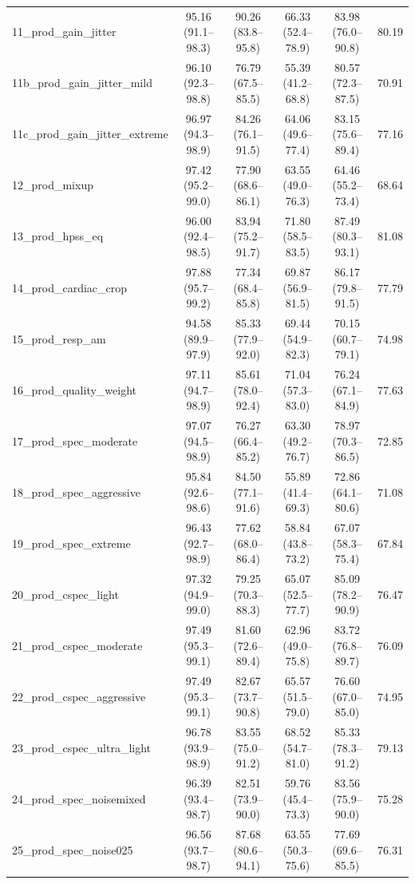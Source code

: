 \documentclass[10pt]{article}
\begin{document}
\begin{longtable}{lccccr}
11\_prod\_gain\_jitter & 95.16 (91.1--98.3) & 90.26 (83.8--95.8) & 66.33 (52.4--78.9) & 83.98 (76.0--90.8) & 80.19 \\
11b\_prod\_gain\_jitter\_mild & 96.10 (92.3--98.8) & 76.79 (67.5--85.5) & 55.39 (41.2--68.8) & 80.57 (72.3--87.5) & 70.91 \\
11c\_prod\_gain\_jitter\_extreme & 96.97 (94.3--98.9) & 84.26 (76.1--91.5) & 64.06 (49.6--77.4) & 83.15 (75.6--89.4) & 77.16 \\
12\_prod\_mixup & 97.42 (95.2--99.0) & 77.90 (68.6--86.1) & 63.55 (49.0--76.3) & 64.46 (55.2--73.4) & 68.64 \\
13\_prod\_hpss\_eq & 96.00 (92.4--98.5) & 83.94 (75.2--91.7) & 71.80 (58.5--83.5) & 87.49 (80.3--93.1) & 81.08 \\
14\_prod\_cardiac\_crop & 97.88 (95.7--99.2) & 77.34 (68.4--85.8) & 69.87 (56.9--81.5) & 86.17 (79.8--91.5) & 77.79 \\
15\_prod\_resp\_am & 94.58 (89.9--97.9) & 85.33 (77.9--92.0) & 69.44 (54.9--82.3) & 70.15 (60.7--79.1) & 74.98 \\
16\_prod\_quality\_weight & 97.11 (94.7--98.9) & 85.61 (78.0--92.4) & 71.04 (57.3--83.0) & 76.24 (67.1--84.9) & 77.63 \\
17\_prod\_spec\_moderate & 97.07 (94.5--98.9) & 76.27 (66.4--85.2) & 63.30 (49.2--76.7) & 78.97 (70.3--86.5) & 72.85 \\
18\_prod\_spec\_aggressive & 95.84 (92.6--98.6) & 84.50 (77.1--91.6) & 55.89 (41.4--69.3) & 72.86 (64.1--80.6) & 71.08 \\
19\_prod\_spec\_extreme & 96.43 (92.7--98.9) & 77.62 (68.0--86.4) & 58.84 (43.8--73.2) & 67.07 (58.3--75.4) & 67.84 \\
20\_prod\_cspec\_light & 97.32 (94.9--99.0) & 79.25 (70.3--88.3) & 65.07 (52.5--77.7) & 85.09 (78.2--90.9) & 76.47 \\
21\_prod\_cspec\_moderate & 97.49 (95.3--99.1) & 81.60 (72.6--89.4) & 62.96 (49.0--75.8) & 83.72 (76.8--89.7) & 76.09 \\
22\_prod\_cspec\_aggressive & 97.49 (95.3--99.1) & 82.67 (73.7--90.8) & 65.57 (51.5--79.0) & 76.60 (67.0--85.0) & 74.95 \\
23\_prod\_cspec\_ultra\_light & 96.78 (93.9--98.9) & 83.55 (75.0--91.2) & 68.52 (54.7--81.0) & 85.33 (78.3--91.2) & 79.13 \\
24\_prod\_spec\_noisemixed & 96.39 (93.4--98.7) & 82.51 (73.9--90.0) & 59.76 (45.4--73.3) & 83.56 (75.9--90.0) & 75.28 \\
25\_prod\_spec\_noise025 & 96.56 (93.7--98.7) & 87.68 (80.6--94.1) & 63.55 (50.3--75.6) & 77.69 (69.6--85.5) & 76.31 \\

\end{longtable}
\end{document}

